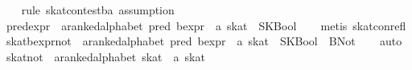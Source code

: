 \begin{isabellebody}
%
\isadelimproof
\ \ %
\endisadelimproof
%
\isatagproof
{}\isamarkupfalse%
\ {}rule\ skat{}con{}test{}ba{}\ assumption{}%
\endisatagproof
{\isafoldproof}%
%
\isadelimproof
\isanewline
%
\endisadelimproof
\isanewline
{}\isamarkupfalse%
\ pred{}expr\ {}{}\ {}{}a{}{}ranked{}alphabet\ pred\ bexpr\ {}\ {}a\ skat{}\ \ SKBool\isanewline
%
\isadelimproof
\ \ %
\endisadelimproof
%
\isatagproof
{}\isamarkupfalse%
\ {}metis\ skat{}con{}refl{}%
\endisatagproof
{\isafoldproof}%
%
\isadelimproof
\isanewline
%
\endisadelimproof
\isanewline
{}\isamarkupfalse%
\ skat{}bexpr{}not\ {}{}\ {}{}a{}{}ranked{}alphabet\ pred\ bexpr\ {}\ {}a\ skat{}\ \ {}SKBool\ {}\ BNot{}\isanewline
%
\isadelimproof
\ \ %
\endisadelimproof
%
\isatagproof
{}\isamarkupfalse%
\ auto%
\endisatagproof
{\isafoldproof}%
%
\isadelimproof
\isanewline
%
\endisadelimproof
\isanewline
{}\isamarkupfalse%
\ skat{}not\ {}{}\ {}{}a{}{}ranked{}alphabet\ skat\ {}\ {}a\ skat{}\ {}{}{}{}{}\ \isanewline

\end{isabellebody}
